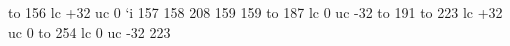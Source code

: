 


\startmapping[ec]


 to 156 lc +32 uc   0
 `i  157               %
 158 208               %
 159 159               %
 to 187 lc   0 uc -32
 to 191                %
 to 223 lc +32 uc   0
 to 254 lc   0 uc -32
 223                   %






